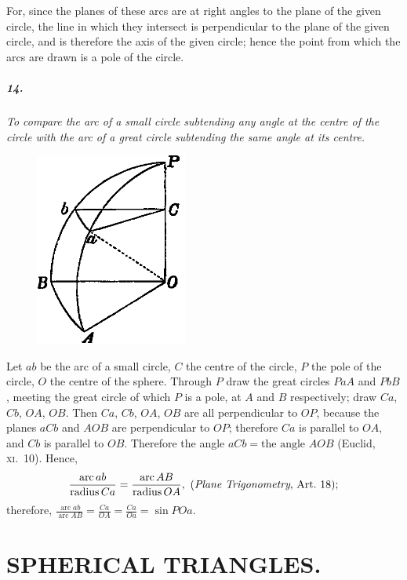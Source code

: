 \documentclass{book}[2004/02/16]
\begin{document}
\begin{mainmatter}
\begin{spacing}{1.3}
For, since the planes of these arcs are at right angles to the
plane of the given circle, the line in which they intersect is perpendicular
to the plane of the given circle, and is therefore the
axis of the given circle; hence the point from which the arcs are
drawn is a pole of the circle.

\paragraph{14.} \textit{To compare the arc of a small circle subtending any angle
at the centre of the circle with the arc of a great circle subtending
the same angle at its centre.}
\begin{figure}[htp]
\centering
\includegraphics[width=5.0cm]{images/016fc}
\end{figure}

Let $ab$ be the arc of a small circle, $C$ the centre of the circle,
$P$ the pole of the circle, $O$ the centre of the sphere. Through $P$
draw the great circles $PaA$ and $PbB$, meeting the great circle
of which $P$ is a pole, at $A$ and $B$ respectively; draw $Ca$, $Cb$, $OA$,
$OB$. Then $Ca$, $Cb$, $OA$, $OB$ are all perpendicular to $OP$, because
the planes $aCb$ and $AOB$ are perpendicular to $OP$; therefore $Ca$
is parallel to $OA$, and $Cb$ is parallel to $OB$. Therefore the angle
$aCb=\text{the angle }AOB$ (Euclid, \textsc{xi}.\ 10). Hence,
\[
  \frac{\operatorname{arc} ab} {\operatorname{radius} Ca}=\frac{\operatorname{arc} AB} {\operatorname{radius} OA},
  \text{ (\textit{Plane Trigonometry}, Art.\ 18)};
\]
therefore,\hfill
$\displaystyle \frac{\operatorname{arc} ab}{\operatorname{arc} AB}=\frac{Ca}{OA}
=\frac{Ca}{Oa}=\sin POa$.\hfill{}

\chapter[Spherical Triangles.]{SPHERICAL TRIANGLES.}


\end{spacing}
\end{mainmatter}
\end{document}
